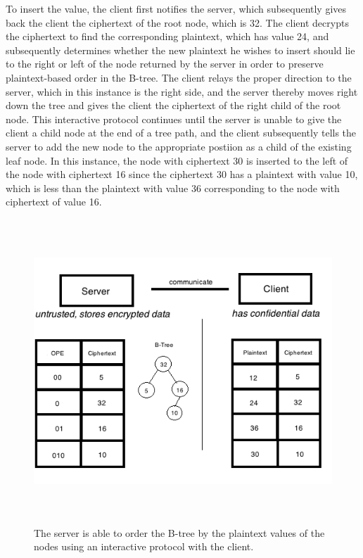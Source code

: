\documentclass[12pt]{article}
\begin{document}
To insert the value, the client first notifies the server, which subsequently gives back the client the ciphertext of the root node, which is 32. The client decrypts the ciphertext to find the corresponding plaintext, which has value 24, and subsequently determines whether the new plaintext he wishes to insert should lie to the right or left of the node returned by the server in order to preserve plaintext-based order in the B-tree. The client relays the proper direction to the server, which in this instance is the right side, and the server thereby moves right down the tree and gives the client the ciphertext of the right child of the root node. This interactive protocol continues until the server is unable to give the client a child node at the end of a tree path, and the client subsequently tells the server to add the new node to the appropriate postiion as a child of the existing leaf node. In this instance, the node with ciphertext 30 is inserted to the left of the node with ciphertext 16 since the ciphertext 30 has a plaintext with value 10, which is less than the plaintext with value 36 corresponding to the node with ciphertext of value 16. 

\begin{figure}[htb]
\begin{center}
\includegraphics[height=4.5in,width=6in,angle=0]{857pic5.png}
\caption{The server is able to order the B-tree by the plaintext values of the nodes using an interactive protocol with the client.}
\end{center}
\end{figure}
\end{document}
